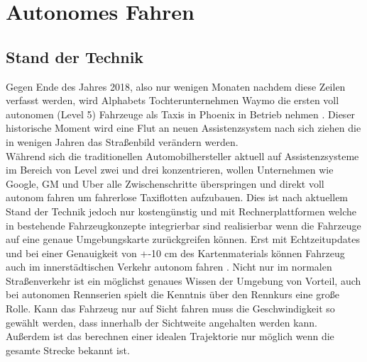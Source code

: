 \documentclass{like}
\begin{document}
  








\setcounter{page}{1}   %

\chapter{Autonomes Fahren}

\section{Stand der Technik}
Gegen Ende des Jahres 2018, also nur wenigen Monaten nachdem diese Zeilen verfasst werden, wird Alphabets Tochterunternehmen Waymo die ersten voll autonomen (Level 5) Fahrzeuge als Taxis in Phoenix in Betrieb nehmen \cite{Waymo}. Dieser historische Moment wird eine Flut an neuen Assistenzsystem nach sich ziehen die in wenigen Jahren das Straßenbild verändern werden. \\
Während sich die traditionellen Automobilhersteller aktuell auf Assistenzsysteme im Bereich von Level zwei und drei konzentrieren, wollen Unternehmen wie Google, GM und Uber alle Zwischenschritte überspringen und direkt voll autonom fahren um fahrerlose Taxiflotten aufzubauen. Dies ist nach aktuellem Stand der Technik jedoch nur kostengünstig und mit Rechnerplattformen welche in bestehende Fahrzeugkonzepte integrierbar sind realisierbar wenn die Fahrzeuge auf eine genaue Umgebungskarte zurückgreifen können. Erst mit Echtzeitupdates und bei einer Genauigkeit von +-10 cm des Kartenmaterials können Fahrzeug auch im innerstädtischen Verkehr autonom fahren \cite{SEIF2016159}. 
Nicht nur im normalen Straßenverkehr ist ein möglichst genaues Wissen der Umgebung von Vorteil, auch bei autonomen Rennserien spielt die Kenntnis über den Rennkurs eine große Rolle. Kann das Fahrzeug nur auf Sicht fahren muss die Geschwindigkeit so gewählt werden, dass innerhalb der Sichtweite angehalten werden kann. Außerdem ist das berechnen einer idealen Trajektorie nur möglich wenn die gesamte Strecke bekannt ist.
\end{document}
